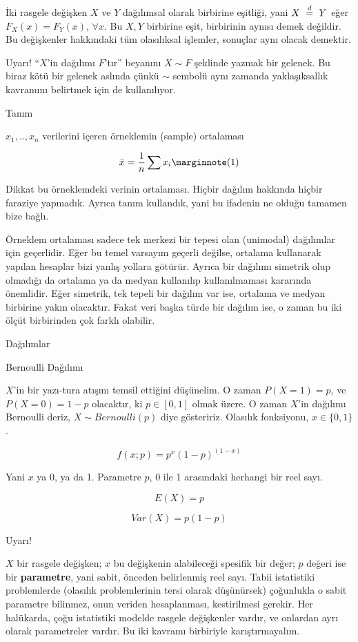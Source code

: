 \documentclass[12pt,fleqn]{article}\usepackage{../../common}
\begin{document}
İki rasgele değişken $X$ ve $Y$ dağılımsal olarak birbirine eşitliği, yani
$X \ \buildrel d \over = \ Y$ eğer $F_X(x) = F_Y(x)$, $\forall x$. Bu $X,Y$ birbirine eşit, birbirinin 
aynısı demek değildir. Bu değişkenler hakkındaki tüm olasılıksal işlemler, 
sonuçlar aynı olacak demektir.

Uyarı! ``$X$'in dağılımı $F$'tır'' beyanını $X \sim F$ şeklinde yazmak bir
gelenek. Bu biraz kötü bir gelenek aslında çünkü $\sim$ sembolü aynı
zamanda yaklaşıksallık kavramını belirtmek için de kullanılıyor.


Tanım

$x_1,..,x_n$ verilerini içeren örneklemin (sample) ortalaması 

$$ \bar{x} = \frac{1}{n} \sum x_i
\mlabel{1}
$$

Dikkat bu örneklemdeki verinin ortalaması. Hiçbir dağılım hakkında hiçbir
faraziye yapmadık. Ayrıca tanım kullandık, yani bu ifadenin ne olduğu
tamamen bize bağlı. 

Örneklem ortalaması sadece tek merkezi bir tepesi olan (unimodal)
dağılımlar için geçerlidir. Eğer bu temel varsayım geçerli değilse,
ortalama kullanarak yapılan hesaplar bizi yanlış yollara götürür. Ayrıca
bir dağılımı simetrik olup olmadığı da ortalama ya da medyan kullanılıp
kullanılmaması kararında önemlidir. Eğer simetrik, tek tepeli bir dağılım
var ise, ortalama ve medyan birbirine yakın olacaktır. Fakat veri başka
türde bir dağılım ise, o zaman bu iki ölçüt birbirinden çok farklı
olabilir.

Dağılımlar

Bernoulli Dağılımı

$X$'in bir yazı-tura atışını temsil ettiğini düşünelim. O zaman $P(X = 1) =p$, 
ve $P(X = 0) = 1 - p$ olacaktır, ki $p \in [0,1]$ olmak üzere. O zaman
$X$'in dağılımı Bernoulli deriz, $X \sim Bernoulli(p)$ diye
gösteririz. Olasılık fonksiyonu, $x \in \{0,1\}$.

$$ f(x;p) = p^x(1-p)^{(1-x)} $$

Yani $x$ ya 0, ya da 1. Parametre $p$, 0 ile 1 arasındaki herhangi bir reel 
sayı. 

$$ E(X) = p $$

$$ Var(X) = p(1-p) $$

Uyarı!

$X$ bir rasgele değişken; $x$ bu değişkenin alabileceği spesifik bir değer;
$p$ değeri ise bir \textbf{parametre}, yani sabit, önceden belirlenmiş reel
sayı. Tabii istatistiki problemlerde (olasılık problemlerinin tersi olarak
düşünürsek) çoğunlukla o sabit parametre bilinmez, onun veriden
hesaplanması, kestirilmesi gerekir. Her halükarda, çoğu istatistiki modelde
rasgele değişkenler vardır, ve onlardan ayrı olarak parametreler vardır. Bu
iki kavramı birbiriyle karıştırmayalım.
\end{document}
